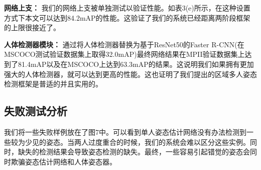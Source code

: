 \textbf{网络上支：} 我们的网络上支被单独测试以验证性能。如表3(e)所示，在这种设置方式下本文可以达到84.2mAP的性能。这验证了我们的系统已经距离两阶段框架的上限很接近了。

\textbf{人体检测器模块：} 通过将人体检测器替换为基于ResNet50的Faster R-CNN(在MSCOCO测试验证数据集上取得32.0mAP)最终网络结果在MPII验证数据集上达到了81.4mAP以及在MSCOCO上达到63.3mAP的结果。这说明我们如果拥有更加强大的人体检测器，就可以达到更高的性能。这也证明了我们提出的区域多人姿态检测框架是普适的并且实用的。

\subsection*{失败测试分析}
我们将一些失败样例放在了图7中。可以看到单人姿态估计网络没有办法检测到一些较为少见的姿态。当两人过度重合的时候，我们的系统会难以区分这些实例。同时，缺失的检测结果会导致姿态检测的缺失。最终，一些容易引起错觉的姿态会同时欺骗姿态估计网络和人体姿态器。

